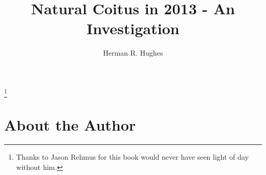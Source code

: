 \documentclass{book}
\begin{document}


\pagestyle{empty}


\title{\textbf{Natural Coitus in 2013 - An Investigation}}
\author{Herman R. Hughes}



\maketitle


\thispagestyle{empty}
\thanks{Thanks to Jason Rehmus for this book would never have seen light of day without him.}
\newpage




\pagestyle{fancy}
\fancyhf{}
\lhead[]{\thepage}
\rhead[\thepage]{}


\doublespacing



\chapter*{About the Author}


\newpage
\thispagestyle{empty}





\newpage
\renewcommand{\cftchapdotsep}{\cftdotsep}
\tableofcontents
\end{document}

